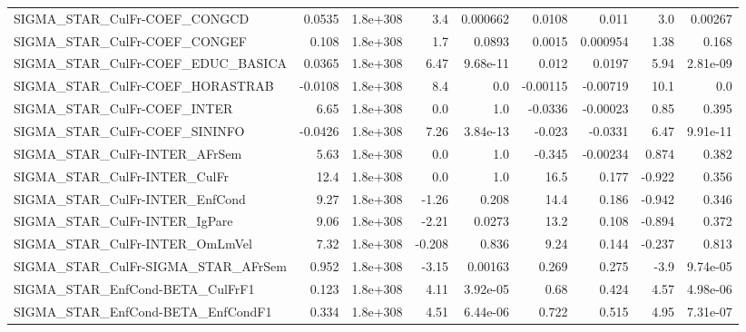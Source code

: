 \begin{tabular}{lrrrrrrrr}
SIGMA\_STAR\_CulFr-COEF\_CONGCD          &      0.0535 &     1.8e+308 &     3.4 & 0.000662 &     0.0108 &       0.011 &          3.0 &       0.00267 \\
SIGMA\_STAR\_CulFr-COEF\_CONGEF          &       0.108 &     1.8e+308 &     1.7 &   0.0893 &     0.0015 &    0.000954 &         1.38 &         0.168 \\
SIGMA\_STAR\_CulFr-COEF\_EDUC\_BASICA     &      0.0365 &     1.8e+308 &    6.47 & 9.68e-11 &      0.012 &      0.0197 &         5.94 &      2.81e-09 \\
SIGMA\_STAR\_CulFr-COEF\_HORASTRAB       &     -0.0108 &     1.8e+308 &     8.4 &      0.0 &   -0.00115 &    -0.00719 &         10.1 &           0.0 \\
SIGMA\_STAR\_CulFr-COEF\_INTER           &        6.65 &     1.8e+308 &     0.0 &      1.0 &    -0.0336 &    -0.00023 &         0.85 &         0.395 \\
SIGMA\_STAR\_CulFr-COEF\_SININFO         &     -0.0426 &     1.8e+308 &    7.26 & 3.84e-13 &     -0.023 &     -0.0331 &         6.47 &      9.91e-11 \\
SIGMA\_STAR\_CulFr-INTER\_AFrSem         &        5.63 &     1.8e+308 &     0.0 &      1.0 &     -0.345 &    -0.00234 &        0.874 &         0.382 \\
SIGMA\_STAR\_CulFr-INTER\_CulFr          &        12.4 &     1.8e+308 &     0.0 &      1.0 &       16.5 &       0.177 &       -0.922 &         0.356 \\
SIGMA\_STAR\_CulFr-INTER\_EnfCond        &        9.27 &     1.8e+308 &   -1.26 &    0.208 &       14.4 &       0.186 &       -0.942 &         0.346 \\
SIGMA\_STAR\_CulFr-INTER\_IgPare         &        9.06 &     1.8e+308 &   -2.21 &   0.0273 &       13.2 &       0.108 &       -0.894 &         0.372 \\
SIGMA\_STAR\_CulFr-INTER\_OmLmVel        &        7.32 &     1.8e+308 &  -0.208 &    0.836 &       9.24 &       0.144 &       -0.237 &         0.813 \\
SIGMA\_STAR\_CulFr-SIGMA\_STAR\_AFrSem    &       0.952 &     1.8e+308 &   -3.15 &  0.00163 &      0.269 &       0.275 &         -3.9 &      9.74e-05 \\
SIGMA\_STAR\_EnfCond-BETA\_CulFrF1       &       0.123 &     1.8e+308 &    4.11 & 3.92e-05 &       0.68 &       0.424 &         4.57 &      4.98e-06 \\
SIGMA\_STAR\_EnfCond-BETA\_EnfCondF1     &       0.334 &     1.8e+308 &    4.51 & 6.44e-06 &      0.722 &       0.515 &         4.95 &      7.31e-07 \\

\end{tabular}
